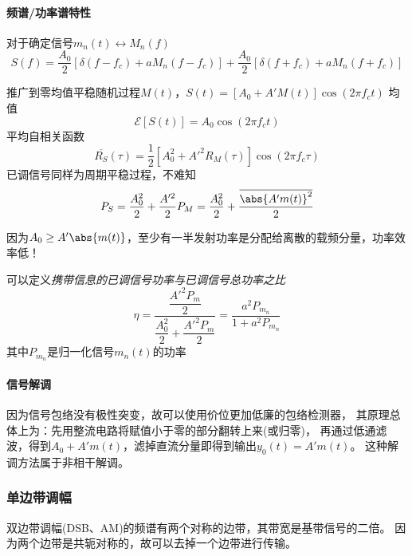     \paragraph{频谱/功率谱特性}\mbox{}

    对于确定信号$m_n(t)\leftrightarrow M_n(f)$
    \begin{equation}
        S(f)=\frac{A_0}{2}[\delta(f-f_c)+aM_n(f-f_c)]+\frac{A_0}{2}[\delta(f+f_c)+aM_n(f+f_c)]
    \end{equation}
    
    推广到零均值平稳随机过程$M(t)$，$S(t)=[A_0+A'M(t)]\cos(2\pi f_ct)$
    均值
    \begin{equation}
        \mathscr{E}[S(t)]=A_0\cos(2\pi f_ct)
    \end{equation}
    平均自相关函数
    \begin{equation}
        \overline{R_S}(\tau)=\frac{1}{2}[A_0^2+A'^2R_M(\tau)]\cos(2\pi f_c\tau)
    \end{equation}
    已调信号同样为周期平稳过程，不难知
    \begin{equation}
        P_S=\frac{A_0^2}{2}+\frac{A'^2}{2}P_M=\frac{A_0^2}{2}+\frac{\overline{\abs{A'm(t)}^2}}{2}
    \end{equation}

    因为$A_0\geq A'\abs{m(t)}$，至少有一半发射功率是分配给离散的载频分量，功率效率低！

    可以定义\emph{携带信息的已调信号功率与已调信号总功率之比}
    \begin{equation}
        \eta=\frac{\dfrac{A'^2P_m}{2}}{\dfrac{A_0^2}{2}+\dfrac{A'^2P_m}{2}}=\frac{a^2P_{m_n}}{1+a^2P_{m_n}}
    \end{equation}
    其中$P_{m_n}$是归一化信号$m_n(t)$的功率

    \paragraph{信号解调}\mbox{}

    因为信号包络没有极性突变，故可以使用价位更加低廉的包络检测器，
    其原理总体上为：先用整流电路将赋值小于零的部分翻转上来(或归零)，
    再通过低通滤波，得到$A_0+A'm(t)$，滤掉直流分量即得到输出$y_0(t)=A'm(t)$。
    这种解调方法属于非相干解调。

    \subsubsection{单边带调幅}\label{subsubsec:SSB}
    双边带调幅(DSB、AM)的频谱有两个对称的边带，其带宽是基带信号的二倍。
    因为两个边带是共轭对称的，故可以去掉一个边带进行传输。

